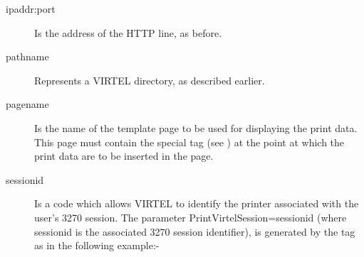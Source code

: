 \documentclass[letterpaper,10pt,english]{sphinxmanual}
\begin{document}
\begin{sphinxVerbatim}[commandchars=\\\{\}]
\end{sphinxVerbatim}
\begin{description}
\item[{ipaddr:port}] \leavevmode
Is the address of the HTTP line, as before.

\item[{pathname}] \leavevmode
Represents a VIRTEL directory, as described earlier.

\item[{pagename}] \leavevmode
Is the name of the template page to be used for displaying the print data. This page must contain the special  tag (see {\hyperref[\detokenize{User_Guide:v457ug-printing}]{}}) at the point at which the print data are to be inserted in the page.

\item[{sessionid}] \leavevmode
Is a code which allows VIRTEL to identify the printer associated with the user’s 3270 session. The parameter PrintVirtelSession=sessionid (where sessionid is the associated 3270 session identifier), is generated by the  tag as in the following example:-

\end{description}

\begin{sphinxVerbatim}[commandchars=\\\{\}]
\end{sphinxVerbatim}

\end{document}
